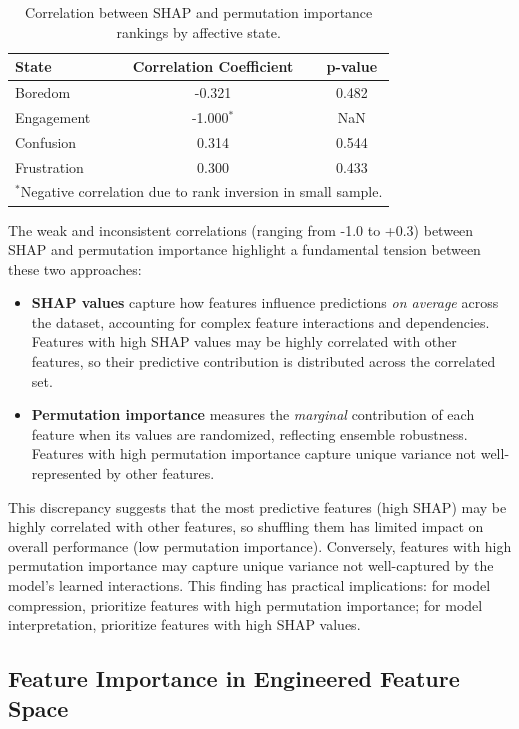 \begin{table}[t]
\centering
\caption{Correlation between SHAP and permutation importance rankings by affective state.}
\label{tab:importance-correlation}
\begin{tabular}{lcc}
\toprule
\textbf{State} & \textbf{Correlation Coefficient} & \textbf{p-value} \\
\midrule
Boredom & -0.321 & 0.482 \\
Engagement & -1.000$^*$ & NaN \\
Confusion & 0.314 & 0.544 \\
Frustration & 0.300 & 0.433 \\
\bottomrule
\multicolumn{3}{l}{$^*$\footnotesize Negative correlation due to rank inversion in small sample.}
\end{tabular}
\end{table}

The weak and inconsistent correlations (ranging from -1.0 to +0.3) between SHAP and permutation importance highlight a fundamental tension between these two approaches:
\begin{itemize}
    \item \textbf{SHAP values} capture how features influence predictions \textit{on average} across the dataset, accounting for complex feature interactions and dependencies. Features with high SHAP values may be highly correlated with other features, so their predictive contribution is distributed across the correlated set.
    \item \textbf{Permutation importance} measures the \textit{marginal} contribution of each feature when its values are randomized, reflecting ensemble robustness. Features with high permutation importance capture unique variance not well-represented by other features.
\end{itemize}

This discrepancy suggests that the most predictive features (high SHAP) may be highly correlated with other features, so shuffling them has limited impact on overall performance (low permutation importance). Conversely, features with high permutation importance may capture unique variance not well-captured by the model's learned interactions. This finding has practical implications: for model compression, prioritize features with high permutation importance; for model interpretation, prioritize features with high SHAP values.

\subsection{Feature Importance in Engineered Feature Space}
\label{sec:engineered-feature-importance}

